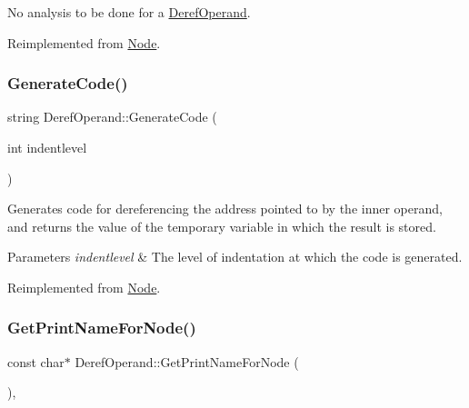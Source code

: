 No analysis to be done for a \hyperlink{class_deref_operand}{Deref\+Operand}. 

Reimplemented from \hyperlink{class_node_a5f88d55c6f253a29def7ccc443d83d47}{Node}.

\mbox{\label{class_deref_operand_a67a9b76b4e9cc9085c03ccf8ed098aff}} 
\subsubsection{\texorpdfstring{Generate\+Code()}{GenerateCode()}}
{\footnotesize\ttfamily string Deref\+Operand\+::\+Generate\+Code (\begin{DoxyParamCaption}\item[{int}]{indentlevel }\end{DoxyParamCaption})\hspace{0.3cm}{\ttfamily [virtual]}}

Generates code for dereferencing the address pointed to by the inner operand, and returns the value of the temporary variable in which the result is stored. 
\begin{DoxyParams}{Parameters}
{\em indentlevel} & The level of indentation at which the code is generated. \\
\hline
\end{DoxyParams}


Reimplemented from \hyperlink{class_node_acb60e526730e8436056375a3055c2c32}{Node}.

\mbox{\label{class_deref_operand_a6cfdfb30a00cc2b0b76cdb511e780411}} 
\subsubsection{\texorpdfstring{Get\+Print\+Name\+For\+Node()}{GetPrintNameForNode()}}
{\footnotesize\ttfamily const char$\ast$ Deref\+Operand\+::\+Get\+Print\+Name\+For\+Node (\begin{DoxyParamCaption}{ }\end{DoxyParamCaption})\hspace{0.3cm}{\ttfamily [inline]}, {\ttfamily [virtual]}}


